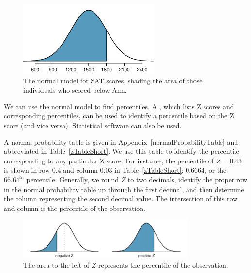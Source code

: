\begin{figure}[htb]
   \centering
   \includegraphics[height=1.5in]{02/figures/satBelow1800/satBelow1800}
   \caption{The normal model for SAT scores, shading the area of those individuals who scored below Ann.}
   \label{satBelow1800}
\end{figure}

We can use the normal model to find percentiles. A , which lists Z scores and corresponding percentiles, can be used to identify a percentile based on the Z score (and vice versa). Statistical software can also be used.

A normal probability table is given in Appendix~\vref{normalProbabilityTable} and abbreviated in Table~\ref{zTableShort}. We use this table to identify the percentile corresponding to any particular Z score. For instance, the percentile of $Z=0.43$ is shown in row $0.4$ and column $0.03$ in Table~\ref{zTableShort}: 0.6664, or the $66.64^{th}$ percentile. Generally, we round $Z$ to two decimals, identify the proper row in the normal probability table up through the first decimal, and then determine the column representing the second decimal value. The intersection of this row and column is the percentile of the observation.

\begin{figure}
\centering
\includegraphics[width=0.8\textwidth]{02/figures/normalTails/normalTails}
\caption{The area to the left of $Z$ represents the percentile of the observation.}
\label{normalTails}
\end{figure}

